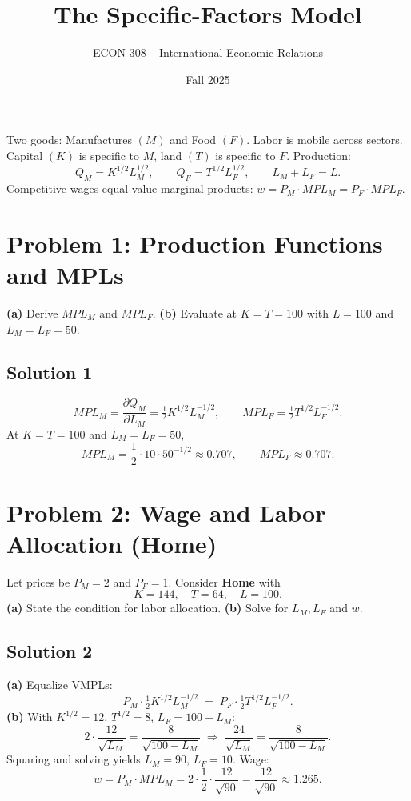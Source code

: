 \documentclass[12pt]{article}
\title{The Specific-Factors Model}
\author{ECON 308 -- International Economic Relations}
\date{Fall 2025}
\begin{document}
\maketitle


Two goods: Manufactures $(M)$ and Food $(F)$. Labor is mobile across sectors. Capital $(K)$ is specific to $M$, land $(T)$ is specific to $F$. Production:
\[
Q_M = K^{1/2} L_M^{1/2}, \qquad Q_F = T^{1/2} L_F^{1/2}, \qquad L_M + L_F = L.
\]
Competitive wages equal value marginal products: $w = P_M \cdot MPL_M = P_F \cdot MPL_F$.

\bigskip

\section*{Problem 1: Production Functions and MPLs}
\textbf{(a)} Derive $MPL_M$ and $MPL_F$. \quad
\textbf{(b)} Evaluate at $K=T=100$ with $L=100$ and $L_M=L_F=50$.

\subsection*{Solution 1}
\[
MPL_M=\frac{\partial Q_M}{\partial L_M}=\tfrac12 K^{1/2} L_M^{-1/2},\qquad
MPL_F=\tfrac12 T^{1/2} L_F^{-1/2}.
\]
At $K=T=100$ and $L_M=L_F=50$,
\[
MPL_M=\frac{1}{2}\cdot 10 \cdot 50^{-1/2}\approx 0.707,\qquad
MPL_F\approx 0.707.
\]

\bigskip

\section*{Problem 2: Wage and Labor Allocation (Home)}
Let prices be $P_M=2$ and $P_F=1$. Consider \textbf{Home} with
\[
K=144,\quad T=64,\quad L=100.
\]
\textbf{(a)} State the condition for labor allocation. \quad
\textbf{(b)} Solve for $L_M, L_F$ and $w$.

\subsection*{Solution 2}
\textbf{(a)} Equalize VMPLs:
\[
P_M \cdot \tfrac12 K^{1/2} L_M^{-1/2} \;=\; P_F \cdot \tfrac12 T^{1/2} L_F^{-1/2}.
\]
\textbf{(b)} With $K^{1/2}=12$, $T^{1/2}=8$, $L_F=100-L_M$:
\[
2 \cdot \frac{12}{\sqrt{L_M}} = \frac{8}{\sqrt{100-L_M}}
\;\Rightarrow\; \frac{24}{\sqrt{L_M}}=\frac{8}{\sqrt{100-L_M}}.
\]
Squaring and solving yields $L_M=90$, $L_F=10$. Wage:
\[
w = P_M \cdot MPL_M
= 2 \cdot \frac{1}{2}\cdot \frac{12}{\sqrt{90}}
= \frac{12}{\sqrt{90}}
\approx 1.265.
\]
\end{document}
